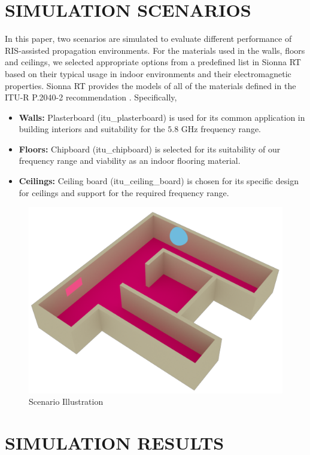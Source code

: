 \documentclass{IEEEoj}
\begin{document}
\section{SIMULATION SCENARIOS}
In this paper, two scenarios are simulated to evaluate different performance of RIS-assisted propagation environments. For the materials used in the walls, floors and ceilings, we selected appropriate options from a predefined list in Sionna RT based on their typical usage in indoor environments and their electromagnetic properties. Sionna RT provides the models of all of the materials defined in the ITU-R P.2040-2 recommendation \cite{ITU}. Specifically,
\begin{itemize}
	\item \textbf{Walls:} Plasterboard (itu\_plasterboard) is used for its common application in building interiors and suitability for the $5.8$ GHz frequency range.
	\item \textbf{Floors:} Chipboard (itu\_chipboard) is selected for its suitability of our frequency range and viability as an indoor flooring material.
	\item \textbf{Ceilings:} Ceiling board (itu\_ceiling\_board) is chosen for its specific design for ceilings and support for the required frequency range.
\end{itemize}

\begin{figure}
	\centering \includegraphics[width=.9\linewidth]{Sim_Results/Scenario_Illustration.png}
	\caption{Scenario Illustration}
	\label{Scenario}
\end{figure}

\section{SIMULATION RESULTS}
\end{document}
